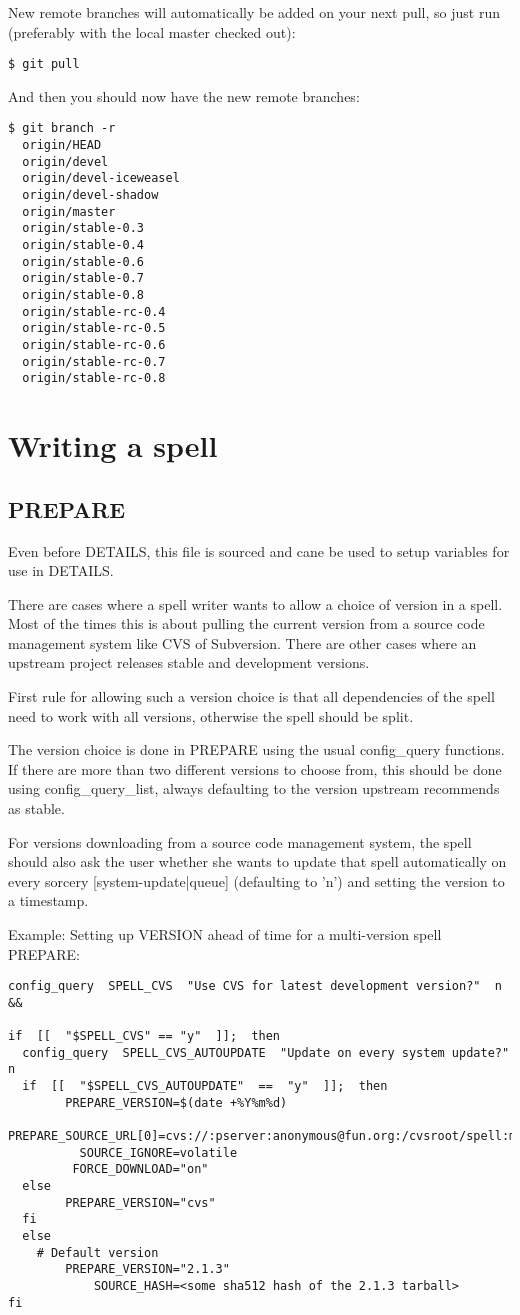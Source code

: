 \documentclass[a4paper,10pt]{book}
\begin{document}
New remote branches will automatically be added on your next pull, so just run
(preferably with the local master checked out):
\begin{verbatim}
$ git pull
\end{verbatim}
And then you should now have the new remote branches:
\begin{verbatim}
$ git branch -r
  origin/HEAD
  origin/devel
  origin/devel-iceweasel
  origin/devel-shadow
  origin/master
  origin/stable-0.3
  origin/stable-0.4
  origin/stable-0.6
  origin/stable-0.7
  origin/stable-0.8
  origin/stable-rc-0.4
  origin/stable-rc-0.5
  origin/stable-rc-0.6
  origin/stable-rc-0.7
  origin/stable-rc-0.8
\end{verbatim}

\chapter{Writing a spell}
\section{PREPARE}
Even before DETAILS, this file is sourced and cane be used to setup variables
for use in DETAILS.

There are cases where a spell writer wants to allow a choice of version in a
spell. Most of the times this is about pulling the current version from a
source code management system like CVS of Subversion. There are other cases
where an upstream project releases stable and development versions.

First rule for allowing such a version choice is that all dependencies of the
spell need to work with all versions, otherwise the spell should be split.

The version choice is done in PREPARE using the usual config\_query functions.
If there are more than two different versions to choose from, this should be
done using config\_query\_list, always defaulting to the version upstream
recommends as stable.

For versions downloading from a source code management system, the spell should
also ask the user whether she wants to update that spell automatically on every
sorcery [system-update|queue] (defaulting to 'n') and setting the version to
a timestamp.

Example: Setting up VERSION ahead of time for a multi-version spell
PREPARE:
\begin{verbatim}
config_query  SPELL_CVS  "Use CVS for latest development version?"  n  &&

if  [[  "$SPELL_CVS" == "y"  ]];  then
  config_query  SPELL_CVS_AUTOUPDATE  "Update on every system update?"  n
  if  [[  "$SPELL_CVS_AUTOUPDATE"  ==  "y"  ]];  then
        PREPARE_VERSION=$(date +%Y%m%d)
  PREPARE_SOURCE_URL[0]=cvs://:pserver:anonymous@fun.org:/cvsroot/spell:main
          SOURCE_IGNORE=volatile
         FORCE_DOWNLOAD="on"
  else
        PREPARE_VERSION="cvs"
  fi
  else
    # Default version
        PREPARE_VERSION="2.1.3"
            SOURCE_HASH=<some sha512 hash of the 2.1.3 tarball>
fi
\end{verbatim}
\end{document}
